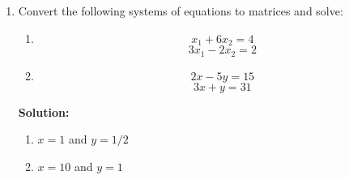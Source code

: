 \documentclass[letter,12pt]{article}
\begin{document}
\begin{enumerate}
    {\bf Solution: }
    \begin{enumerate}
        \item A and b
        \item B and a
        \item C and c
    \end{enumerate}
    
    \item Convert the following systems of equations to matrices and solve: 
    
    \begin{enumerate}
        \item $$x_1 + 6x_2 = 4$$ $$3 x_1 - 2x_2 = 2$$
        
        \item $$2x - 5y = 15$$ $$3x + y = 31$$ 
    \end{enumerate}
    
    {\bf Solution: }
    \begin{enumerate}
        \item $x = 1$ and $y = 1/2$
        \item $x = 10$ and $y = 1$
    \end{enumerate}
\end{enumerate}
\end{document}
